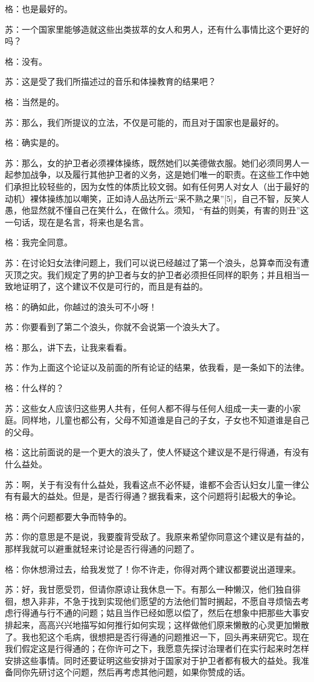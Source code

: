 \documentclass[12pt,oneside]{book}
\begin{document}
格：也是最好的。

苏：一个国家里能够造就这些出类拔萃的女人和男人，还有什么事情比这个更好的吗？

格：没有。

苏：这是受了我们所描述过的音乐和体操教育的结果吧？

格：当然是的。

苏：那么，我们所提议的立法，不仅是可能的，而且对于国家也是最好的。

格：确实是的。

苏：那么，女的护卫者必须裸体操练，既然她们以美德做衣服。她们必须同男人一起参加战争，以及履行其他护卫者的义务，这是她们唯一的职责。在这些工作中她们承担比较轻些的，因为女性的体质比较文弱。如有任何男人对女人（出于最好的动机）裸体操练加以嘲笑，正如诗人品达所云“采不熟之果”[5]，自己不智，反笑人愚，他显然就不懂自己在笑什么，在做什么。须知，“有益的则美，有害的则丑”这一句话，现在是名言，将来也是名言。

格：我完全同意。

苏：在讨论妇女法律问题上，我们可以说已经越过了第一个浪头，总算幸而没有遭灭顶之灾。我们规定了男的护卫者与女的护卫者必须担任同样的职务；并且相当一致地证明了，这个建议不仅是可行的，而且是有益的。

格：的确如此，你越过的浪头可不小呀！

苏：你要看到了第二个浪头，你就不会说第一个浪头大了。

格：那么，讲下去，让我来看看。

苏：作为上面这个论证以及前面的所有论证的结果，依我看，是一条如下的法律。

格：什么样的？

苏：这些女人应该归这些男人共有，任何人都不得与任何人组成一夫一妻的小家庭。同样地，儿童也都公有，父母不知道谁是自己的子女，子女也不知道谁是自己的父母。

格：这比前面说的是一个更大的浪头了，使人怀疑这个建议是不是行得通，有没有什么益处。

苏：啊，关于有没有什么益处，我看这点不必怀疑，谁都不会否认妇女儿童一律公有有最大的益处。但是，是否行得通？据我看来，这个问题将引起极大的争论。

格：两个问题都要大争而特争的。

苏：你的意思是不是说，我要腹背受敌了。我原来希望你同意这个建议是有益的，那样我就可以避重就轻来讨论是否行得通的问题了。

格：你休想滑过去，给我发觉了！你不许走，你得对两个建议都要说出道理来。

苏：好，我甘愿受罚，但请你原谅让我休息一下。有那么一种懒汉，他们独自徘徊，想入非非，不急于找到实现他们愿望的方法他们暂时搁起，不愿自寻烦恼去考虑行得通与行不通的问题；姑且当作已经如愿以偿了，然后在想象中把那些大事安排起来，高高兴兴地描写如何推行如何实现；这样做他们原来懒散的心灵更加懒散了。我也犯这个毛病，很想把是否行得通的问题推迟一下，回头再来研究它。现在我们假定这是行得通的；在你许可之下，我愿意先探讨治理者们在实行起来时怎样安排这些事情。同时还要证明这些安排对于国家对于护卫者都有极大的益处。我准备同你先研讨这个问题，然后再考虑其他问题，如果你赞成的话。
\end{document}
